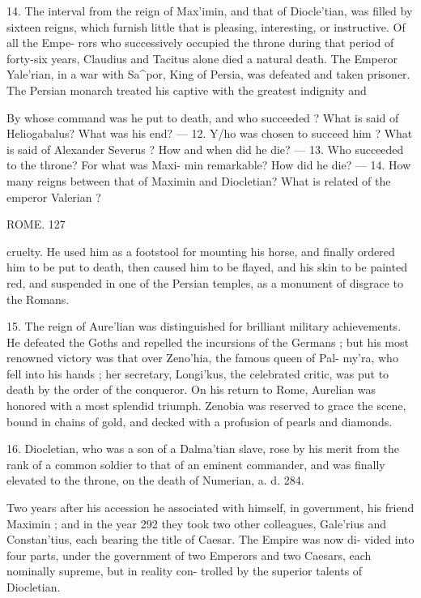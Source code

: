 \documentclass[openany,a4paper]{memoir}
\begin{document}
14. The interval from the reign of Max'imin, and that of 
Diocle'tian, was filled by sixteen reigns, which furnish little 
that is pleasing, interesting, or instructive. Of all the Empe- 
rors who successively occupied the throne during that period 
of forty-six years, Claudius and Tacitus alone died a natural 
death. The Emperor Yale'rian, in a war with Sa^por, King 
of Persia, was defeated and taken prisoner. The Persian 
monarch treated his captive with the greatest indignity and 

By whose command was he put to death, and who succeeded ? What 
is said of Heliogabalus? What was his end? — 12. Y/ho was chosen to 
succeed him ? What is said of Alexander Severus ? How and when 
did he die? — 13. Who succeeded to the throne? For what was Maxi- 
min remarkable? How did he die? — 14. How many reigns between 
that of Maximin and Diocletian? What is related of the emperor 
Valerian ? 



ROME. 127 

cruelty. He used him as a footstool for mounting his horse, 
and finally ordered him to be put to death, then caused him 
to be flayed, and his skin to be painted red, and suspended 
in one of the Persian temples, as a monument of disgrace 
to the Romans. 

15. The reign of Aure'lian was distinguished for brilliant 
military achievements. He defeated the Goths and repelled 
the incursions of the Germans ; but his most renowned 
victory was that over Zeno'hia, the famous queen of Pal- 
my'ra, who fell into his hands ; her secretary, Longi'kus, 
the celebrated critic, was put to death by the order of the 
conqueror. On his return to Rome, Aurelian was honored 
with a most splendid triumph. Zenobia was reserved to 
grace the scene, bound in chains of gold, and decked with a 
profusion of pearls and diamonds. 

16. Diocletian, who was a son of a Dalma'tian slave, rose 
by his merit from the rank of a common soldier to that of 
an eminent commander, and was finally elevated to the 
throne, on the death of Numerian, a. d. 284. 

Two years after his accession he associated with himself, 
in government, his friend Maximin ; and in the year 292 
they took two other colleagues, Gale'rius and Constan'tius, 
each bearing the title of Caesar. The Empire was now di- 
vided into four parts, under the government of two Emperors 
and two Caesars, each nominally supreme, but in reality con- 
trolled by the superior talents of Diocletian. 
\end{document}
